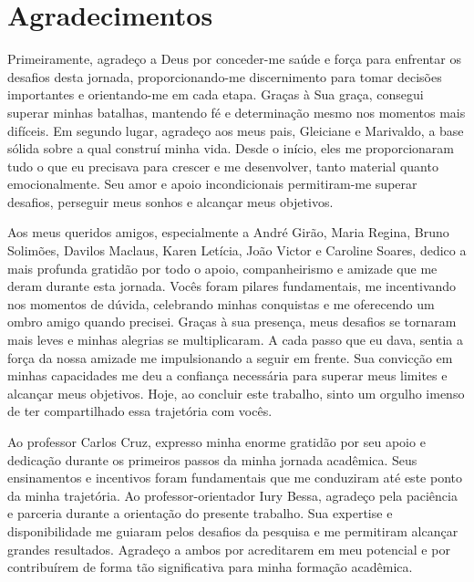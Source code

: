 \chapter*{Agradecimentos}
\thispagestyle{empty}

Primeiramente, agradeço a Deus por conceder-me saúde e força para enfrentar os desafios desta jornada, proporcionando-me discernimento para tomar decisões importantes e orientando-me em cada etapa. Graças à Sua graça, consegui superar minhas batalhas, mantendo fé e determinação mesmo nos momentos mais difíceis. Em segundo lugar, agradeço aos meus pais, Gleiciane e Marivaldo, a base sólida sobre a qual construí minha vida. Desde o início, eles me proporcionaram tudo o que eu precisava para crescer e me desenvolver, tanto material quanto emocionalmente. Seu amor e apoio incondicionais permitiram-me superar desafios, perseguir meus sonhos e alcançar meus objetivos.

Aos meus queridos amigos, especialmente a André Girão, Maria Regina, Bruno Solimões, Davilos Maclaus, Karen Letícia, João Victor e Caroline Soares, dedico a mais profunda gratidão por todo o apoio, companheirismo e amizade que me deram durante esta jornada. Vocês foram pilares fundamentais, me incentivando nos momentos de dúvida, celebrando minhas conquistas e me oferecendo um ombro amigo quando precisei. Graças à sua presença, meus desafios se tornaram mais leves e minhas alegrias se multiplicaram. A cada passo que eu dava, sentia a força da nossa amizade me impulsionando a seguir em frente. Sua convicção em minhas capacidades me deu a confiança necessária para superar meus limites e alcançar meus objetivos. Hoje, ao concluir este trabalho, sinto um orgulho imenso de ter compartilhado essa trajetória com vocês.

Ao professor Carlos Cruz, expresso minha enorme gratidão por seu apoio e dedicação durante os primeiros passos da minha jornada acadêmica. Seus ensinamentos e incentivos foram fundamentais que me conduziram até este ponto da minha trajetória. Ao professor-orientador Iury Bessa, agradeço pela paciência e parceria durante a orientação do presente trabalho. Sua expertise e disponibilidade me guiaram pelos desafios da pesquisa e me permitiram alcançar grandes resultados. Agradeço a ambos por acreditarem em meu potencial e por contribuírem de forma tão significativa para minha formação acadêmica.
